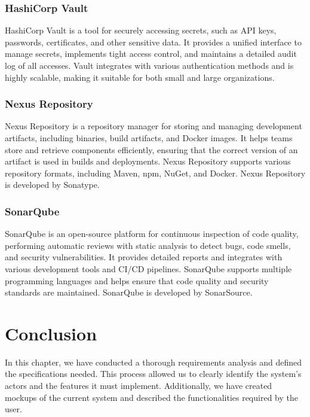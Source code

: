 \subsubsection{HashiCorp Vault}
HashiCorp Vault is a tool for securely accessing secrets, such as API keys, passwords, certificates, and other sensitive data. It provides a unified interface to manage secrets, implements tight access control, and maintains a detailed audit log of all accesses. Vault integrates with various authentication methods and is highly scalable, making it suitable for both small and large organizations.

\subsubsection{Nexus Repository}
Nexus Repository is a repository manager for storing and managing development artifacts, including binaries, build artifacts, and Docker images. It helps teams store and retrieve components efficiently, ensuring that the correct version of an artifact is used in builds and deployments. Nexus Repository supports various repository formats, including Maven, npm, NuGet, and Docker. Nexus Repository is developed by Sonatype.

\subsubsection{SonarQube}
SonarQube is an open-source platform for continuous inspection of code quality, performing automatic reviews with static analysis to detect bugs, code smells, and security vulnerabilities. It provides detailed reports and integrates with various development tools and CI/CD pipelines. SonarQube supports multiple programming languages and helps ensure that code quality and security standards are maintained. SonarQube is developed by SonarSource.


\section*{Conclusion}
In this chapter, we have conducted a thorough requirements analysis and defined the specifications needed.
This process allowed us to clearly identify the system's actors and the features it must implement. Additionally,
we have created mockups of the current system and described the functionalities required by the user.